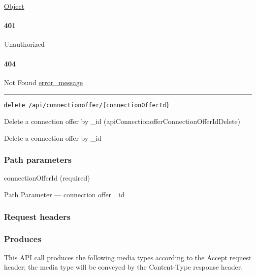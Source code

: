 \protect\hyperlink{Object}{Object}

\hypertarget{section-156}{%
\paragraph{401}\label{section-156}}

Unauthorized \protect\hyperlink{}{}

\hypertarget{section-157}{%
\paragraph{404}\label{section-157}}

Not Found \protect\hyperlink{error_message}{error\_message}

\begin{center}\rule{0.5\linewidth}{\linethickness}\end{center}

\protect\hypertarget{apiConnectionofferConnectionOfferIdDelete}{}{}

\begin{verbatim}
delete /api/connectionoffer/{connectionOfferId}
\end{verbatim}

Delete a connection offer by \_id
({apiConnectionofferConnectionOfferIdDelete})

Delete a connection offer by \_id

\hypertarget{path-parameters-25}{%
\subsubsection{Path parameters}\label{path-parameters-25}}

connectionOfferId (required)

{Path Parameter} --- connection offer \_id

\hypertarget{request-headers-25}{%
\subsubsection{Request headers}\label{request-headers-25}}

\hypertarget{produces-48}{%
\subsubsection{Produces}\label{produces-48}}

This API call produces the following media types according to the
{Accept} request header; the media type will be conveyed by the
{Content-Type} response header.

